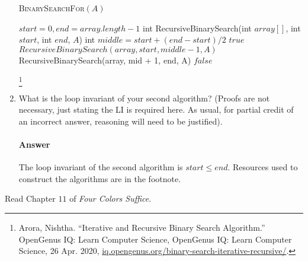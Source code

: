 \documentclass{article}
\begin{document}
\begin{enumerate}
        \begin{algorithm}
            \caption{\textsc{BinarySearchFor}$(A)$}\label{alg:recursion}
            \begin{algorithmic}
				\Require $start = 0, end = array.length -1$  
                  \State int RecursiveBinarySearch(int $array[]$, int $start$, int $end$, $A$) 
					\State int $middle = start + (end - start)/2$
						\State \Return $true$
						\State \Return $RecursiveBinarySearch(array, start, middle - 1, A)$
					\Else
						\State \Return RecursiveBinarySearch(array, mid + 1, end, A)
					\EndIf
					\State \Return $false$
            \end{algorithmic}
        \end{algorithm}
		\footnote{Arora, Nishtha. “Iterative and Recursive Binary Search Algorithm.” OpenGenus IQ: Learn Computer Science, OpenGenus IQ: Learn Computer Science, 26 Apr. 2020, \url{iq.opengenus.org/binary-search-iterative-recursive/}.} 

    \item What is the loop invariant of your second algorithm? (Proofs are not
        necessary, just stating the LI is required here.  As usual, for partial
        credit of an incorrect answer, reasoning will need to be justified).

        \paragraph{Answer}

        The loop invariant of the second algorithm is $start \leq end$. Resources used to construct the algorithms are in the footnote. 
\end{enumerate}

 

Read Chapter $11$ of \emph{Four Colors Suffice}.
\end{document}
